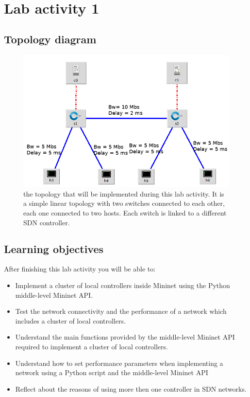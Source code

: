 \section*{Lab activity 1}

\subsection*{Topology diagram}
\begin{figure}[htb]
	\centering
	\includegraphics[width=0.8\linewidth]{img/topology-1.png}
	\caption{the topology that will be implemented during this lab activity.
  It is a simple linear topology with two switches connected to each other,
  each one connected to two hosts. Each switch is linked to a different
  SDN controller.}
	\label{fig:topology-1}
\end{figure}





\subsection*{Learning objectives}
After finishing this lab activity you will be able to:
\begin{itemize}
  \item Implement a cluster of local controllers inside Mininet using the Python
  middle-level Mininet API.
  \item Test the network connectivity and the performance of a network which
  includes a cluster of local controllers.
  \item Understand the main functions provided by the middle-level Mininet API required
  to implement a cluster of local controllers.
	\item Understand how to set performance parameters when implementing a network
	using a Python script and the middle-level Mininet API
  \item Reflect about the reasons of using more then one controller in SDN networks.
\end{itemize}







